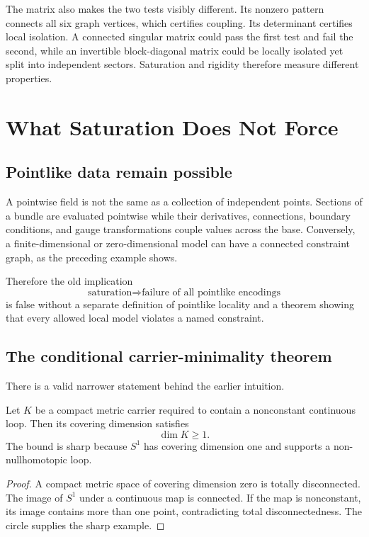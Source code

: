 \documentclass[11pt]{article}
\begin{document}
The matrix also makes the two tests visibly different.  Its nonzero pattern
connects all six graph vertices, which certifies coupling.  Its determinant
certifies local isolation.  A connected singular matrix could pass the first
test and fail the second, while an invertible block-diagonal matrix could be
locally isolated yet split into independent sectors.  Saturation and rigidity
therefore measure different properties.

\section{What Saturation Does Not Force}

\subsection{Pointlike data remain possible}

A pointwise field is not the same as a collection of independent points.
Sections of a bundle are evaluated pointwise while their derivatives,
connections, boundary conditions, and gauge transformations couple values
across the base.  Conversely, a finite-dimensional or zero-dimensional model
can have a connected constraint graph, as the preceding example shows.

Therefore the old implication
\[
 \text{saturation}\Longrightarrow
 \text{failure of all pointlike encodings}
\]
is false without a separate definition of pointlike locality and a theorem
showing that every allowed local model violates a named constraint.

\subsection{The conditional carrier-minimality theorem}

There is a valid narrower statement behind the earlier intuition.

\begin{theorem}\label{thm:loop-dimension}
Let $K$ be a compact metric carrier required to contain a nonconstant
continuous loop.  Then its covering dimension satisfies
\[
 \dim K\ge 1.
\]
The bound is sharp because $S^1$ has covering dimension one and supports a
non-nullhomotopic loop.
\end{theorem}

\begin{proof}
A compact metric space of covering dimension zero is totally disconnected.
The image of $S^1$ under a continuous map is connected.  If the map is
nonconstant, its image contains more than one point, contradicting total
disconnectedness.  The circle supplies the sharp example.
\end{proof}
\end{document}
